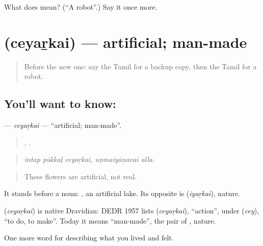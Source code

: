 \begin{tcolorbox}[breakable,colback=teal!4,colframe=teal!35!black,title={Before you move on}]
What does  mean? (\textquotedblleft{}A robot\textquotedblright{}.) Say it once more.
\end{tcolorbox}
\section[\texorpdfstring{\ta{செயற்கை} (ceyaṟkai)}{செயற்கை (ceyaṟkai)}]{ (ceyaṟkai) — artificial; man-made}

\label{lesson:TA-C518-ceyarkai}



\begin{quote}
Before the new one: say the Tamil for a backup copy, then the Tamil for a robot.
\end{quote}

\subsection*{You'll want to know: }
\textbf{} — \emph{ceyaṟkai} — \textquotedblleft{}artificial; man-made\textquotedblright{}.

\begin{quote}
  ,  .
\end{quote}

\begin{quote}
\emph{intap pūkkaḷ ceyaṟkai, uṇmaiyāṉavai alla.}
\end{quote}

\begin{quote}
These flowers are artificial, not real.
\end{quote}

It stands before a noun:  , an artificial lake. Its opposite is  (\emph{iyaṟkai}), nature.

\begin{cousinweb}
\textbf{} (\emph{ceyaṟkai}) is native Dravidian: DEDR 1957 lists  (\emph{ceyaṟkai}), \textquotedblleft{}action\textquotedblright{}, under  (\emph{cey}), \textquotedblleft{}to do, to make\textquotedblright{}. Today it means \textquotedblleft{}man-made\textquotedblright{}, the pair of , nature.
\end{cousinweb}

\begin{grammarlens}[title={What you've built}]
One more word for describing what you lived and felt.
\end{grammarlens}

